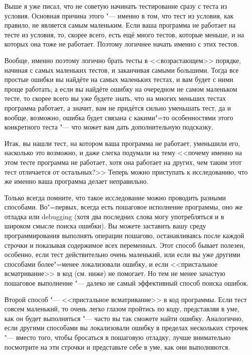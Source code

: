\documentclass[a4paper,10pt]{problems}
\begin{document}
Выше я уже писал, что не советую начинать тестирование сразу с теста из условия. 
Основная причина этого "--- именно в том, что тест из условия, как правило, не является самым маленьким. 
Если ваша программа не работает на тесте из условия, то, скорее всего, есть ещё много тестов, которые меньше, и на которых она тоже не работает.
Поэтому логичнее начать именно с этих тестов.

Вообще, именно поэтому логично брать тесты в <<возрастающем>> порядке, начиная с самых маленьких тестов, и заканчивая самыми большими.
Тогда все простые ошибки вы найдёте на самых маленьких тестах, и вам будет с ними проще работать;
а если вы найдёте ошибку на очередном не самом маленьком тесте, то скорее всего вы уже будете знать, что на многих меньших тестах программа
работает, а значит, вам не придётся сильно уменьшать тест, да и вообще, возможно, ошибка будет связана с какими"=то особенностями этого конкретного теста
"--- что может вам дать дополнительную подсказку.

Итак, вы нашли тест, на котором ваша программа не работает, уменьшили его, насколько это возможно, и даже слегка подумали на тему 
<<почему именно на этом тесте программа не работает, хотя она работает на других, чем таким этот тест отличается от остальных?>> 
Теперь можно приступать к исследованию, что же именно ваша программа делает неправильно.

Только всегда помните, что такое исследование можно проводить разными способами.
Во"=первых, всегда есть пошаговое исполнение программы, оно же отладка или debugging (хотя два последних слова могу употребляться
и в широком смысле поиска ошибки).
Вы можете заставить вашу среду программирования выполнять операции пошагово, останавливаясь после каждой строчки и показывая содержимое всех переменных.
Этот способ бывает полезен, особенно, если тест действительно очень маленький, или если вы уже другими способами более"=менее локализовали ошибку,
и если <<пристальное всматривание>> в код (см. ниже) не помогает. 
Но тем не менее зачастую пошаговое выполнение "--- далеко не самый эффективный способ поиска ошибок.

Второй способ "--- <<пристальное всматривание>> в код программы. 
Если тест совсем маленький, то очень легко глазом пройтись по коду, представляя в уме, как он будет выполняться "--- часто вы так сможете найти ошибку.
Аналогично, если другими способами вы локализовали ошибку в пределах нескольких строчек "--- вместо того, чтобы бросаться в пошаговую отладку,
лучше внимательно посмотрите на эти строчки и представьте себе в уме, как они выполняются.
\end{document}
